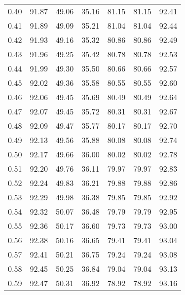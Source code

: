 \begin{tabular}{|c|c|c|c|c|c|c|}
      0.40 &     91.87 &     49.06 &      35.16 &   81.15 &      81.15 &         92.41 \\
      0.41 &     91.89 &     49.09 &      35.21 &   81.04 &      81.04 &         92.44 \\
      0.42 &     91.93 &     49.16 &      35.32 &   80.86 &      80.86 &         92.49 \\
      0.43 &     91.96 &     49.25 &      35.42 &   80.78 &      80.78 &         92.53 \\
      0.44 &     91.99 &     49.30 &      35.50 &   80.66 &      80.66 &         92.57 \\
      0.45 &     92.02 &     49.36 &      35.58 &   80.55 &      80.55 &         92.60 \\
      0.46 &     92.06 &     49.45 &      35.69 &   80.49 &      80.49 &         92.64 \\
      0.47 &     92.07 &     49.45 &      35.72 &   80.31 &      80.31 &         92.67 \\
      0.48 &     92.09 &     49.47 &      35.77 &   80.17 &      80.17 &         92.70 \\
      0.49 &     92.13 &     49.56 &      35.88 &   80.08 &      80.08 &         92.74 \\
      0.50 &     92.17 &     49.66 &      36.00 &   80.02 &      80.02 &         92.78 \\
      0.51 &     92.20 &     49.76 &      36.11 &   79.97 &      79.97 &         92.83 \\
      0.52 &     92.24 &     49.83 &      36.21 &   79.88 &      79.88 &         92.86 \\
      0.53 &     92.29 &     49.98 &      36.38 &   79.85 &      79.85 &         92.92 \\
      0.54 &     92.32 &     50.07 &      36.48 &   79.79 &      79.79 &         92.95 \\
      0.55 &     92.36 &     50.17 &      36.60 &   79.73 &      79.73 &         93.00 \\
      0.56 &     92.38 &     50.16 &      36.65 &   79.41 &      79.41 &         93.04 \\
      0.57 &     92.41 &     50.21 &      36.75 &   79.24 &      79.24 &         93.08 \\
      0.58 &     92.45 &     50.25 &      36.84 &   79.04 &      79.04 &         93.13 \\
      0.59 &     92.47 &     50.31 &      36.92 &   78.92 &      78.92 &         93.16 \\

\end{tabular}
